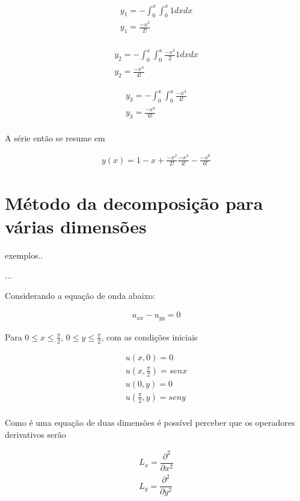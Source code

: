 \begin{gather*}
y_{1} = -\int_0^x \int_0^x  1dxdx\\
y_{1} = \frac{-x^2}{2!}\\
\end{gather*}

\begin{gather*}
y_{2} = -\int_0^x \int_0^x\frac{-x^2}{2}1dxdx\\
y_{2} = \frac{-x^4}{4!}
\end{gather*}

\begin{gather*}
y_{3} = -\int_0^x\int_0^x \frac{-x^4}{4!}\\
y_{3} = \frac{-x^6}{6!}\\
\end{gather*}



A série então se resume em

\begin{gather*}
y(x) = 1 - x + \frac{-x^2}{2!} \frac{-x^4}{4!}- \frac{-x^6}{6!}
\end{gather*}

\section{Método da decomposição para várias dimensões}
exemplos..

...

Considerando a equação de onda abaixo:

\begin{gather*}
 u_{xx} - u_{yy} = 0
\end{gather*}

Para $0\leq x \leq \frac{\pi}{2}$, $0\leq y \leq \frac{\pi}{2}$, com as condições iniciais 

\begin{gather*}
u(x,0) = 0\\
u\left(x,\frac{\pi}{2}\right) = senx\\
u(0,y) = 0\\
u\left(\frac{\pi}{2},y\right) = seny\\
\end{gather*}

Como é uma equação de duas dimensões é possível perceber que os operadores derivativos serão

\begin{gather*}
L_{x} =\dfrac{\partial ^2}{\partial x^2}\\
L_{y} = \dfrac{\partial ^2}{\partial y^2}       
\end{gather*}

